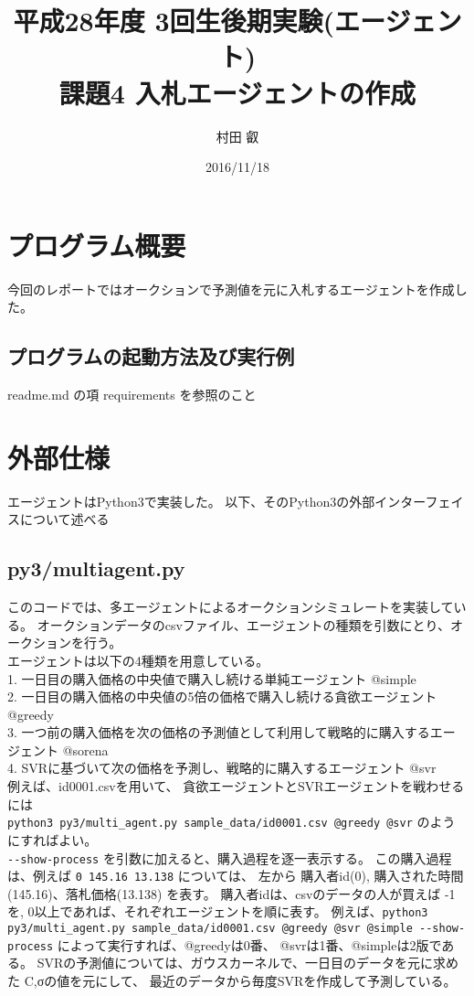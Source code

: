\documentclass[]{jsarticle}
\begin{document}
\title{平成28年度 3回生後期実験(エージェント) \\ 課題4 入札エージェントの作成 }
\author{村田 叡}
\date{ 2016/11/18 }
\maketitle

\section{プログラム概要}
今回のレポートではオークションで予測値を元に入札するエージェントを作成した。

\subsection{プログラムの起動方法及び実行例}
readme.md  の項 requirements を参照のこと

\section{外部仕様}
エージェントはPython3で実装した。
以下、そのPython3の外部インターフェイスについて述べる

\subsection{py3/multiagent.py}
このコードでは、多エージェントによるオークションシミュレートを実装している。
オークションデータのcsvファイル、エージェントの種類を引数にとり、オークションを行う。 \\
エージェントは以下の4種類を用意している。 \\
1. 一日目の購入価格の中央値で購入し続ける単純エージェント @simple \\
2. 一日目の購入価格の中央値の5倍の価格で購入し続ける貪欲エージェント @greedy \\
3. 一つ前の購入価格を次の価格の予測値として利用して戦略的に購入するエージェント @sorena \\
4. SVRに基づいて次の価格を予測し、戦略的に購入するエージェント @svr \\
例えば、id0001.csvを用いて、 貪欲エージェントとSVRエージェントを戦わせるには \\
\verb|python3 py3/multi_agent.py sample_data/id0001.csv @greedy @svr|
のようにすればよい。 \\
\verb|--show-process| を引数に加えると、購入過程を逐一表示する。
この購入過程は、例えば \verb|0 145.16 13.138| については、
左から 購入者id(0), 購入された時間(145.16)、落札価格(13.138) を表す。
購入者idは、csvのデータの人が買えば -1を,
0以上であれば、それぞれエージェントを順に表す。
例えば、\verb|python3 py3/multi_agent.py sample_data/id0001.csv @greedy @svr @simple --show-process|
 によって実行すれば、@greedyは0番、 @svrは1番、@simpleは2版である。
SVRの予測値については、ガウスカーネルで、一日目のデータを元に求めた C,σの値を元にして、
最近のデータから毎度SVRを作成して予測している。
\end{document}

